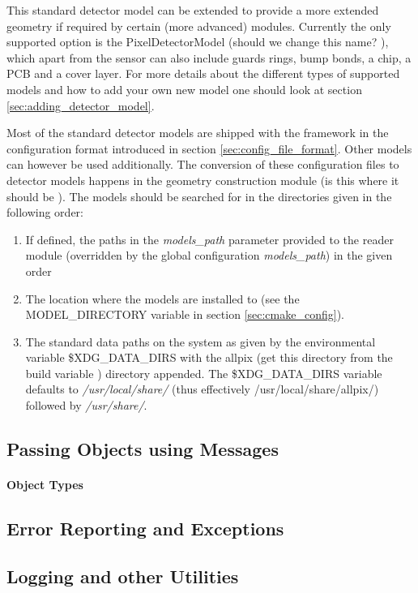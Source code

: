 This standard detector model can be extended to provide a more extended geometry if required by certain (more advanced) modules. Currently the only supported option is the PixelDetectorModel (\todo should we change this name? \todo), which apart from the sensor can also include guards rings, bump bonds, a chip, a PCB and a cover layer. For more details about the different types of supported models and how to add your own new model one should look at section \ref{sec:adding_detector_model}.

Most of the standard detector models are shipped with the framework in the configuration format introduced in section \ref{sec:config_file_format}. Other models can however be used additionally. The conversion of these configuration files to detector models happens in the geometry construction module (\todo is this where it should be \todo). The models should be searched for in the directories given in the following order:
\begin{enumerate}
\item If defined, the paths in the \textit{models\_path} parameter provided to the reader module (overridden by the global configuration \textit{models\_path}) in the given order
\item The location where the models are installed to (see the MODEL\_DIRECTORY variable in section \ref{sec:cmake_config}). 
\item The standard data paths on the system as given by the environmental variable \$XDG\_DATA\_DIRS with the allpix (\todo get this directory from the build variable \todo) directory appended. The \$XDG\_DATA\_DIRS variable defaults to \textit{/usr/local/share/} (thus effectively /usr/local/share/allpix/) followed by \textit{/usr/share/}.
\end{enumerate}

\subsection{Passing Objects using Messages}
\label{sec:objects_messages}
\paragraph{Object Types}
\subsection{Error Reporting and Exceptions}
\subsection{Logging and other Utilities}
\label{sec:logging_utilities}
